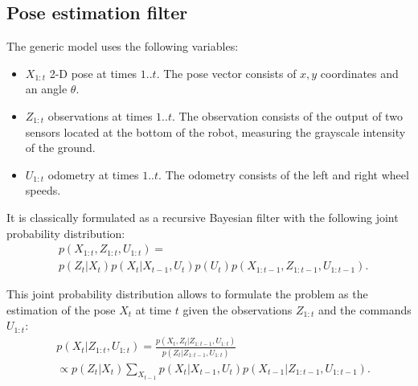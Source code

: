 \documentclass[letterpaper, 10pt, conference]{ieeeconf}
\begin{document}
\subsection{Pose estimation filter}

The generic model uses the following variables:
\begin{itemize}
\item $X_{1:t}$ 2-D pose at times $1..t$.
The pose vector consists of $x,y$ coordinates and an angle $\theta$.
\item $Z_{1:t}$ observations at times $1..t$.
The observation consists of the output of two sensors located at the bottom of the robot, measuring the grayscale intensity of the ground.
\item $U_{1:t}$ odometry at times $1..t$.
The odometry consists of the left and right wheel speeds.
\end{itemize}

It is classically formulated as a recursive Bayesian filter with the following joint probability distribution:
\begin{equation*}
\begin{split}
& p(X_{1:t}, Z_{1:t}, U_{1:t}) = \\
& p(Z_t|X_t) p(X_t|X_{t-1}, U_{t}) p(U_t) p(X_{1:t-1}, Z_{1:t-1}, U_{1:t-1}).
\end{split}
\end{equation*}

This joint probability distribution allows to formulate the problem as the estimation of the pose $X_t$ at time $t$ given the observations $Z_{1:t}$ and the commands $U_{1:t}$:
\begin{equation*}
\begin{split}
& p(X_t|Z_{1:t},U_{1:t}) = \frac{p(X_t,Z_t | Z_{1:t-1}, U_{1:t})}{p(Z_t|Z_{1:t-1}, U_{1:t})} \\
 &\propto p(Z_t | X_t) \sum_{X_{t-1}} p(X_t|X_{t-1}, U_t) p(X_{t-1} | Z_{1:t-1}, U_{1:t-1}).
\end{split}
\end{equation*}
\end{document}
